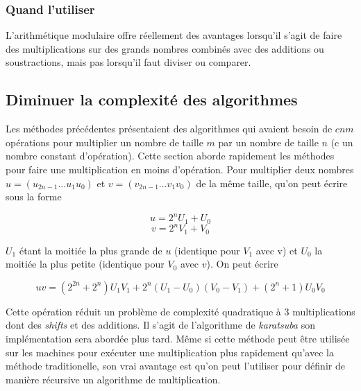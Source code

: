 \documentclass[letterpaper]{article}
\begin{document}

\subsubsection{Quand l'utiliser}

L'arithmétique modulaire offre réellement des avantages lorsqu'il s'agit de faire
des multiplications sur des grands nombres combinés avec des additions ou
soustractions, mais pas lorsqu'il faut diviser ou comparer.

\subsection{Diminuer la complexité des algorithmes}

Les méthodes précédentes présentaient des algorithmes qui avaient besoin de
$cnm$ opérations pour multiplier un nombre de taille $m$ par un nombre de
taille $n$ (c un nombre constant d'opération). Cette section aborde rapidement
les méthodes pour faire une multiplication en moins d'opération.
\newline
Pour multiplier deux nombres $u = (u_{2n-1} \dots u_1 u_0)$ et
$v = (v_{2n-1} \dots v_1 v_0)$ de la même taille, qu'on peut écrire sous la
forme

  $$u = 2^{n} U_1 + U_0$$
  $$v = 2^{n} V_1 + V_0$$

$U_1$ étant la moitiée la plus grande de $u$ (identique pour $V_1$ avec v) et
$U_0$ la moitiée la plus petite (identique pour $V_0$ avec $v$). On peut écrire

  $$uv = (2^{2n} + 2^n) U_1 V_1 + 2^n (U_1 - U_0) (V_0 - V_1) + (2^n + 1) U_0 V_0$$

Cette opération réduit un problème de complexité quadratique à 3 multiplications
dont des \emph{shifts} et des additions. Il s'agit de l'algorithme de
\emph{karatsuba} son implémentation sera abordée plus tard.
\newline
Même si cette méthode peut être utilisée sur les machines pour exécuter une
multiplication plus rapidement qu'avec la méthode traditionelle, son vrai
avantage est qu'on peut l'utiliser pour définir de manière récursive un
algorithme de multiplication.

\end{document}
